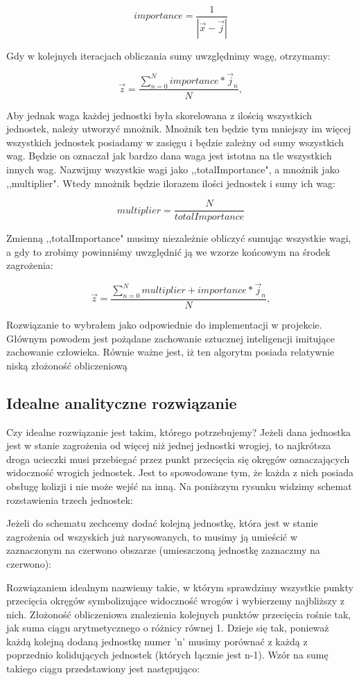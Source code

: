 \documentclass[12pt]{report}
\begin{document}
$$ importance = \dfrac{1}{|\vec x - \vec j|} $$

Gdy w kolejnych iteracjach obliczania sumy uwzględnimy wagę, otrzymamy:

$$\vec z = \dfrac{\sum_{n=0}^{N}  {importance * \vec j_n}}{N},   $$

Aby jednak waga każdej jednostki była skorelowana z ilością wszystkich jednostek, należy utworzyć mnożnik. Mnożnik ten będzie tym mniejszy im więcej wszystkich jednostek posiadamy w zasięgu i będzie zależny od sumy wszystkich wag. Będzie on oznaczał jak bardzo dana waga jest istotna na tle wszystkich innych wag. Nazwijmy wszystkie wagi jako ,,totalImportance", a mnożnik jako ,,multiplier". Wtedy mnożnik będzie ilorazem ilości jednostek i sumy ich wag:

$$ multiplier = \dfrac{N}{totalImportance} $$

Zmienną ,,totalImportance" musimy niezależnie obliczyć sumując wszystkie wagi, a gdy to zrobimy powinniśmy uwzględnić ją we wzorze końcowym na środek zagrożenia:

$$\vec z = \dfrac{\sum_{n=0}^{N}  {multiplier + importance * \vec j_n}}{N},   $$

Rozwiązanie to wybrałem jako odpowiednie do implementacji w projekcie. Głównym powodem jest pożądane zachowanie sztucznej inteligencji imitujące zachowanie człowieka. Równie ważne jest, iż ten algorytm posiada relatywnie niską złożoność obliczeniową 

\subsection{Idealne analityczne rozwiązanie}

Czy idealne rozwiązanie jest takim, którego potrzebujemy?
Jeżeli dana jednostka jest w stanie zagrożenia od więcej niż jednej jednostki wrogiej, to najkrótsza droga ucieczki musi przebiegać przez punkt przecięcia się okręgów oznaczających widoczność wrogich jednostek. Jest to spowodowane tym, że każda z nich posiada obsługę kolizji i nie może wejść na inną.
Na poniższym rysunku widzimy schemat rozstawienia trzech jednostek:

Jeżeli do schematu zechcemy dodać kolejną jednostkę, która jest w stanie zagrożenia od wszyskich już narysowanych, to musimy ją umieścić w zaznaczonym na czerwono obszarze (umieszczoną jednostkę zaznaczmy na czerwono):

Rozwiązaniem idealnym nazwiemy takie, w którym sprawdzimy wszystkie punkty przecięcia okręgów symbolizujące widoczność wrogów i wybierzemy najbliższy z nich. Złożoność obliczeniowa znalezienia kolejnych punktów przecięcia rośnie tak, jak suma ciągu arytmetycznego o różnicy równej 1. Dzieje się tak, ponieważ każdą kolejną dodaną jednostkę numer 'n' musimy porównać z każdą z poprzednio kolidujących jednostek (których łącznie jest n-1). Wzór na sumę takiego ciągu przedstawiony jest następująco: 
\end{document}

